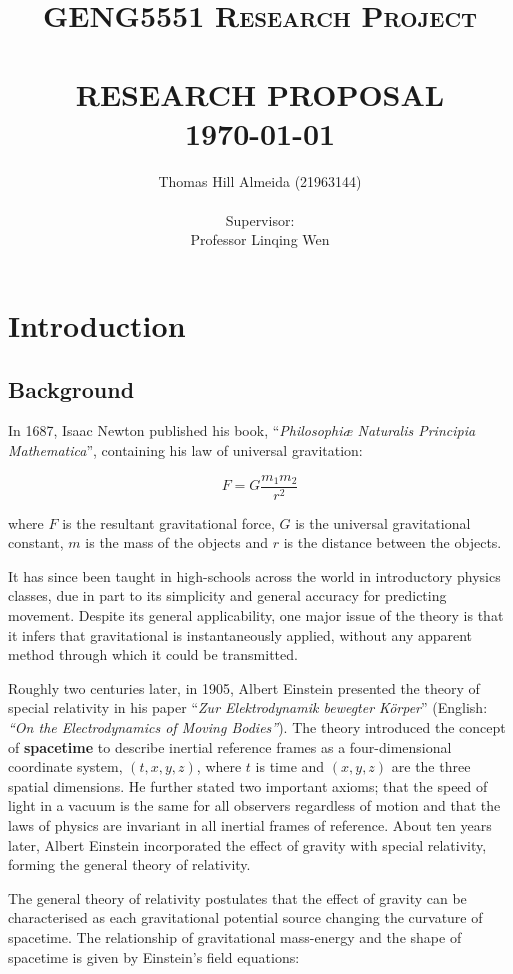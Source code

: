 \documentclass{article}
\title{\normalsize \textsc{GENG5551 Research Project}
        \\ [1.5cm]
        \HRule{0.5pt} \\
        \LARGE \textbf{\uppercase{Research Proposal}}
        \HRule{2pt} \\ [0.5cm]
        \normalsize \today \vspace*{3\baselineskip}}
\author{Thomas Hill Almeida (21963144)\\
\\
Supervisor:\\
Professor Linqing Wen
}
\date{}
\begin{document}
\maketitle{}
\tableofcontents{}
\newpage{}

\section{Introduction}
\subsection{Background}

In 1687, Isaac Newton published his book, ``\textit{Philosophi\ae{} Naturalis Principia
Mathematica}'', containing his law of universal gravitation:

\begin{equation}
    F = G\dfrac{m_1m_2}{r^2}
\end{equation}

where \(F\) is the resultant gravitational force, \(G\) is the universal gravitational constant,
\(m\) is the mass of the objects and \(r\) is the distance between the objects.

It has since been taught in high-schools across the world in introductory physics classes, due in
part to its simplicity and general accuracy for predicting movement. Despite its general
applicability, one major issue of the theory is that it infers that gravitational is instantaneously
applied, without any apparent method through which it could be transmitted.

Roughly two centuries later, in 1905, Albert Einstein presented the theory of special relativity
in his paper ``\textit{Zur Elektrodynamik bewegter K{\"o}rper}'' (English: \textit{``On the
Electrodynamics of Moving Bodies''}). The theory introduced the concept of \textbf{spacetime} to
describe inertial reference frames as a four-dimensional coordinate system, \((t, x, y, z)\), where
$t$ is time and \((x, y, z)\) are the three spatial dimensions. He further stated two important
axioms; that the speed of light in a vacuum is the same for all observers regardless of motion and
that the laws of physics are invariant in all inertial frames of reference. About ten years later,
Albert Einstein incorporated the effect of gravity with special relativity, forming the general
theory of relativity.

The general theory of relativity postulates that the effect of gravity can be characterised as each
gravitational potential source changing the curvature of spacetime. The relationship of
gravitational mass-energy and the shape of spacetime is given by Einstein's field equations:
\end{document}
